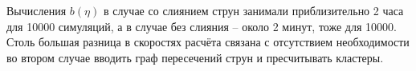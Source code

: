 Вычисления $b(\eta)$ в случае со слиянием струн занимали приблизительно 2 часа для 10000 симуляций, а в случае без слияния -- около 2 минут, тоже для 10000. Столь большая разница в скоростях расчёта связана с отсутствием необходимости во втором случае вводить граф пересечений струн и пресчитывать кластеры.